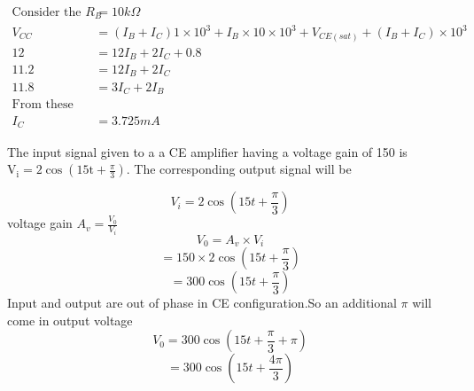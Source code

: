\begin{enumerate}
\begin{answer}
\begin{align*}
\text{Consider the loop containing base resisitor} R_B&=10k\Omega\\
V_{CC}&=(I_B+I_C)1\times 10^3+I_B\times 10\times 10^3+V_{CE(sat)}+(I_B+I_C)\times 10^3\\
12&=12I_B+2I_C+0.8\\
11.2&=12I_B+2I_C\\
11.8&=3I_C+2I_B\\
\text{From these two equations we will get }\\
I_C&=3.725mA
\end{align*}	
\end{answer}
	\begin{minipage}{\textwidth}
	\item The input signal given to a a CE amplifier having a voltage gain of 150 is $\mathrm{V}_{\mathrm{i}}=2 \cos \left(15 \mathrm{t}+\frac{\pi}{3}\right)$. The corresponding output signal will be
\end{minipage}
\begin{answer}
$$V_i=2\cos(15t+\frac{\pi}{3})$$
voltage gain $A_v=\frac{V_0}{V_i}$
$$V_0=A_v\times V_i$$
$$=150\times 2 \cos (15t+\frac{\pi}{3})	$$
$$=300\cos (15t+\frac{\pi}{3})$$
Input and output are out of phase in CE configuration.So an additional $\pi$ will come in output voltage\\
$$V_0=300\cos (15t+\frac{\pi}{3}+\pi)$$
$$=300\cos(15t+\frac{4\pi}{3})$$
\end{answer}	
\end{enumerate}



